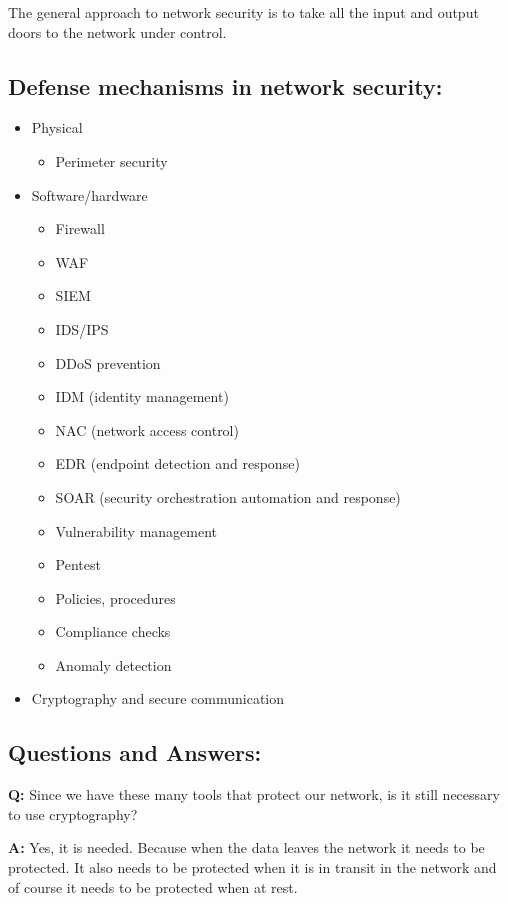 \documentclass[12pt]{article}
\begin{document}
The general approach to network security is to take all the input and output doors to the network under control.

\subsection*{Defense mechanisms in network security:}
\begin{itemize}
    \item Physical
    \begin{itemize}
        \item Perimeter security
    \end{itemize}
    \item Software/hardware
    \begin{itemize}
        \item Firewall
        \item WAF
        \item SIEM
        \item IDS/IPS
        \item DDoS prevention
        \item IDM (identity management)
        \item NAC (network access control)
        \item EDR (endpoint detection and response)
        \item SOAR (security orchestration automation and response)
        \item Vulnerability management
        \item Pentest
        \item Policies, procedures
        \item Compliance checks
        \item Anomaly detection
    \end{itemize}
    \item Cryptography and secure communication
\end{itemize}

\subsection*{Questions and Answers:}
\textbf{Q:} Since we have these many tools that protect our network, is it still necessary to use cryptography?

\textbf{A:} Yes, it is needed. Because when the data leaves the network it needs to be protected. It also needs to be protected when it is in transit in the network and of course it needs to be protected when at rest.
\end{document}
